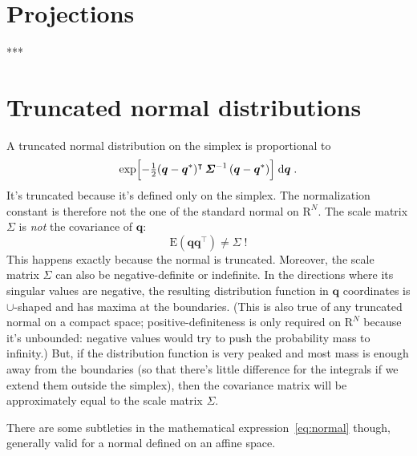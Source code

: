 \documentclass[\ifafour a4paper,12pt,\else a5paper,10pt,\fi%
onecolumn,oneside,article,%
british%
]{memoir}
\theoremstyle{remark}
\theoremstyle{innote}
\newcommand*{\di}{\mathrm{d}}%
\newcommand*{\RR}{\bm{\mathrm{R}}}
\newcommand*{\E}{\mathrm{E}}
\renewcommand*{\|}[1][]{\nonscript\,#1\vert\nonscript\;\mathopen{}}
\newcommand*{\T}{^\intercal}%
\newcommand*{\yq}{\bm{q}}
\newcommand*{\yqr}{\yq^{*}}
\newcommand*{\ySigma}{\bm{\varSigma}}
\begin{document}
\section{Projections}
\label{sec:projections}

***

\section{Truncated normal distributions}
\label{sec:normal_distr}

A truncated normal distribution on the simplex is proportional to
\begin{equation}
  \label{eq:normal}
\exp\Bigl[-\tfrac{1}{2}
(\yq-\yqr)\T \, \ySigma^{-1}\, (\yq-\yqr)
  \Bigr] \;\di\yq\;.
\end{equation}
It's truncated because it's defined only on the simplex. The normalization
constant is therefore not the one of the standard normal on $\RR^{N}$.
The scale matrix $\ySigma$ is \emph{not} the covariance of $\yq$:
\begin{equation}
  \label{eq:normal_not_cov}
  \E(\yq\yq\T) \ne \ySigma \;!
\end{equation}
This happens exactly because the normal is truncated. Moreover, the scale
matrix $\ySigma$ can also be negative-definite or indefinite. In the
directions where its singular values are negative, the resulting
distribution function in $\yq$ coordinates is $\cup$-shaped and has maxima
at the boundaries. (This is also true of any truncated normal on a compact
space; positive-definiteness is only required on $\RR^{N}$ because it's
unbounded: negative values would try to push the probability mass to
infinity.) But, if the distribution function is very peaked and most mass
is enough away from the boundaries (so that there's little difference for
the integrals if we extend them outside the simplex), then the covariance
matrix will be approximately equal to the scale matrix $\ySigma$.

There are some subtleties in the mathematical expression~\eqref{eq:normal}
though, generally valid for a normal defined on an affine space.
\end{document}

